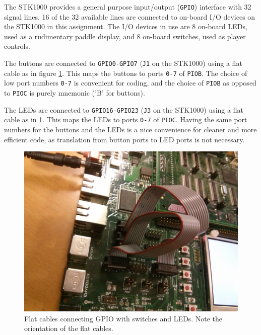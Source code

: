 The STK1000 provides a general purpose input/output (\texttt{GPIO}) interface with 32 signal lines.
16 of the 32 available lines are connected to on-board I/O devices on the STK1000 in this assignment.
The I/O devices in use are 8 on-board LEDs, used as a rudimentary paddle display, and 8 on-board switches, used as player controls.

The buttons are connected to \texttt{GPIO0-GPIO7} (\texttt{J1} on the STK1000) using a flat cable as in figure \ref{flat-cable-image}. This maps the buttons to ports \texttt{0-7} of \texttt{PIOB}.
The choice of low port numbers \texttt{0-7} is convenient for coding, and the choice of \texttt{PIOB} as opposed to \texttt{PIOC} is purely mnemonic ('B' for buttons).

The LEDs are connected to \texttt{GPIO16-GPIO23} (\texttt{J3} on the STK1000) using a flat cable as in \ref{flat-cable-image}. This maps the LEDs to ports \texttt{0-7} of \texttt{PIOC}.
Having the same port numbers for the buttons and the LEDs is a nice convenience for cleaner and more efficient code, as translation from button ports to LED ports is not necessary.

\begin{figure}
\includegraphics[width = \textwidth]{description-and-methodology/flat-cable-image.jpg}
\caption{Flat cables connecting GPIO with switches and LEDs. Note the orientation of the flat cables.}
\label{flat-cable-image}
\end{figure}
